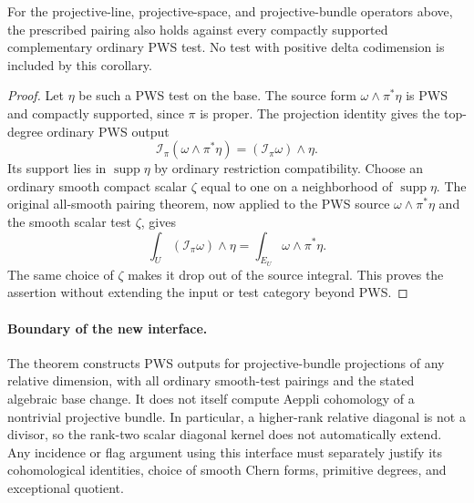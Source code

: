 \begin{corollary}
\label{r15ps:PWS-tests}
For the projective-line, projective-space, and projective-bundle
operators above, the prescribed pairing also holds against
every compactly supported complementary ordinary PWS test.
No test with positive delta codimension is included by this
corollary.
\end{corollary}

\begin{proof}
Let $\eta$ be such a PWS test on the base.  The source form
$\omega\wedge\pi^*\eta$ is PWS and compactly supported,
since $\pi$ is proper.  The projection identity gives the
top-degree ordinary PWS output
\[
 \mathcal I_\pi(\omega\wedge\pi^*\eta)
                             =(\mathcal I_\pi\omega)\wedge\eta.
\]
Its support lies in $\operatorname{supp}\eta$ by ordinary
restriction compatibility.  Choose an ordinary smooth compact
scalar $\zeta$ equal to one on a neighborhood of
$\operatorname{supp}\eta$.  The original all-smooth pairing
theorem, now applied to the PWS source
$\omega\wedge\pi^*\eta$ and the smooth scalar test $\zeta$,
gives
\[
 \int_U(\mathcal I_\pi\omega)\wedge\eta
     =\int_{E_U}\omega\wedge\pi^*\eta.
\]
The same choice of $\zeta$ makes it drop out of the source
integral.  This proves the assertion without extending the
input or test category beyond PWS.
\end{proof}

\paragraph{Boundary of the new interface.}
The theorem constructs PWS outputs for projective-bundle
projections of any relative dimension, with all ordinary
smooth-test pairings and the stated algebraic base change.
It does not itself compute Aeppli cohomology of a nontrivial
projective bundle.  In particular, a higher-rank relative
diagonal is not a divisor, so the rank-two scalar diagonal
kernel does not automatically extend.  Any incidence or flag
argument using this interface must separately justify its
cohomological identities, choice of smooth Chern forms,
primitive degrees, and exceptional quotient.
